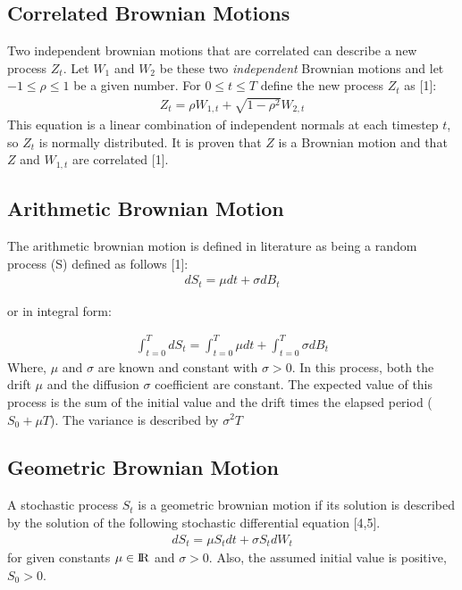 \documentclass[12pt,twoside]{reedthesis}
\theoremstyle{definition}
\theoremstyle{definition}
\theoremstyle{remark}
\begin{document}
  \subsection{Correlated Brownian Motions}\label{corr}
  
  Two independent brownian motions that are correlated can describe a new
  process \(Z_t\). Let \(W_1\) and \(W_2\) be these two \emph{independent}
  Brownian motions and let \(-1 \leq \rho \leq 1\) be a given number. For
  \(0 \leq t \leq T\) define the new process \(Z_t\) as {[}1{]}:
  \begin{align}
  \label{eq:corr_brow}
  Z_t = \rho W_{1,t} + \sqrt{1-\rho^2}W_{2,t}
  \end{align}
  \noindent
  This equation is a linear combination of independent normals at each
  timestep \(t\), so \(Z_t\) is normally distributed. It is proven that
  \(Z\) is a Brownian motion and that \(Z\) and \(W_{1,t}\) are correlated
  {[}1{]}.
  
  \subsection{Arithmetic Brownian
  Motion}\label{arithmetic-brownian-motion}
  
  The arithmetic brownian motion is defined in literature as being a
  random process (S) defined as follows {[}1{]}:
  \begin{align}
  dS_t = \mu dt + \sigma dB_t
  \end{align}
  \begin{center}or in integral form:\end{center}
  \begin{align}
  \int_{t=0}^{T} dS_t = \int_{t=0}^{T}{\mu dt} + \int_{t=0}^{T}{\sigma dB_t}
  \end{align}
  \noindent
  Where, \(\mu\) and \(\sigma\) are known and constant with
  \(\sigma > 0\). In this process, both the drift \(\mu\) and the
  diffusion \(\sigma\) coefficient are constant. The expected value of
  this process is the sum of the initial value and the drift times the
  elapsed period (\(S_0 + \mu T\)). The variance is described by
  \(\sigma^2 T\)
  
  \subsection{Geometric Brownian Motion}\label{geometric-brownian-motion}
  
  A stochastic process \(S_t\) is a geometric brownian motion if its
  solution is described by the solution of the following stochastic
  differential equation {[}4,5{]}.
  \begin{align}
  dS_t = \mu S_t dt + \sigma S_t dW_t
  \end{align}
  \noindent
  for given constants \(\mu \in {\rm I\!R}\) and \(\sigma > 0\). Also, the
  assumed initial value is positive, \(S_0 >0\).
  
\end{document}
